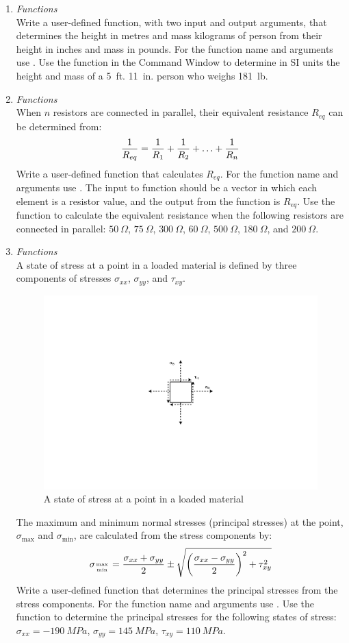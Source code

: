 \begin{enumerate}
\item \textit{Functions}\\
Write a user-defined function, with two input and output arguments, that determines the height in metres and mass kilograms of person from their height in inches and mass in pounds. For the function name and arguments use . Use the function in the Command Window to determine in SI units the height and mass of a 5~ft. 11~in. person who weighs 181~lb.

\item \textit{Functions}\\
When $n$ resistors are connected in parallel, their equivalent resistance $R_{eq}$ can be determined from:
\begin{equation*}
\frac{1}{R_{eq}} = \frac{1}{R_1} + \frac{1}{R_2} + \mathellipsis +\frac{1}{R_n} 
\end{equation*}
Write a user-defined function that calculates $R_{eq}$. For the function name and arguments use . The input to function should be a vector in which each element is a resistor value, and the output from the function is $R_{eq}$. Use the function to calculate the equivalent resistance when the following resistors are connected in parallel: $50~\Omega$, $75~\Omega$, $300~\Omega$, $60~\Omega$, $500~\Omega$, $180~\Omega$, and $200~\Omega$.

\item \textit{Functions}\\
A \twod state of stress at a point in a loaded material is defined by three components of stresses $\sigma_{xx}$, $\sigma_{yy}$, and $\tau_{xy}$. 
\begin{figure}[h]
	\myfloatalign
	\includegraphics[width=0.45\linewidth]{Graphics/Additional-Ex/2D-stress}
	\caption{A \twod state of stress at a point in a loaded material}
	\label{fig:2D-stress}
\end{figure}
The maximum and minimum normal stresses (principal stresses) at the point, $\sigma_{\textrm{max}}$ and $\sigma_{\textrm{min}}$, are calculated from the stress components by:
\begin{equation*}
\sigma_{\textrm{max} \atop \textrm{min}} = \frac{\sigma_{xx}+\sigma_{yy}}{2} \pm \sqrt{{\left( \frac{\sigma_{xx}-\sigma_{yy}}{2} \right)}^2 + \tau_{xy}^2}
\end{equation*}
Write a user-defined function that determines the principal stresses from the stress components. For the function name and arguments use . Use the function to determine the principal stresses for the following states of stress: $\sigma_{xx} = -190~MPa$, $\sigma_{yy} = 145~MPa$, $\tau_{xy} = 110~MPa$.


\end{enumerate}
